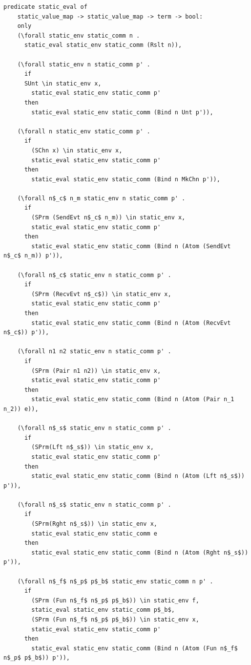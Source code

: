 \documentclass[10pt]{article}
\begin{document}
\begin{lstlisting}[language=logic, mathescape]
  predicate static_eval of
    static_value_map -> static_value_map -> term -> bool:
    only
    (\forall static_env static_comm n .
      static_eval static_env static_comm (Rslt n)),

    (\forall static_env n static_comm p' .
      if 
      SUnt \in static_env x,
        static_eval static_env static_comm p'
      then
        static_eval static_env static_comm (Bind n Unt p')),

    (\forall n static_env static_comm p' .
      if 
        (SChn x) \in static_env x,
        static_eval static_env static_comm p'
      then  
        static_eval static_env static_comm (Bind n MkChn p')),

    (\forall n$_c$ n_m static_env n static_comm p' .
      if
        (SPrm (SendEvt n$_c$ n_m)) \in static_env x,
        static_eval static_env static_comm p' 
      then
        static_eval static_env static_comm (Bind n (Atom (SendEvt n$_c$ n_m)) p')),

    (\forall n$_c$ static_env n static_comm p' . 
      if 
        (SPrm (RecvEvt n$_c$)) \in static_env x,
        static_eval static_env static_comm p'
      then
        static_eval static_env static_comm (Bind n (Atom (RecvEvt n$_c$)) p')),

    (\forall n1 n2 static_env n static_comm p' .
      if
        (SPrm (Pair n1 n2)) \in static_env x,
        static_eval static_env static_comm p'
      then
        static_eval static_env static_comm (Bind n (Atom (Pair n_1 n_2)) e)),

    (\forall n$_s$ static_env n static_comm p' .
      if
        (SPrm(Lft n$_s$)) \in static_env x,
        static_eval static_env static_comm p' 
      then
        static_eval static_env static_comm (Bind n (Atom (Lft n$_s$)) p')),

    (\forall n$_s$ static_env n static_comm p' .
      if
        (SPrm(Rght n$_s$)) \in static_env x, 
        static_eval static_env static_comm e
      then
        static_eval static_env static_comm (Bind n (Atom (Rght n$_s$)) p')),

    (\forall n$_f$ n$_p$ p$_b$ static_env static_comm n p' .
      if
        (SPrm (Fun n$_f$ n$_p$ p$_b$)) \in static_env f, 
        static_eval static_env static_comm p$_b$, 
        (SPrm (Fun n$_f$ n$_p$ p$_b$)) \in static_env x, 
        static_eval static_env static_comm p'
      then
        static_eval static_env static_comm (Bind n (Atom (Fun n$_f$ n$_p$ p$_b$)) p')),


\end{lstlisting}
\end{document}

